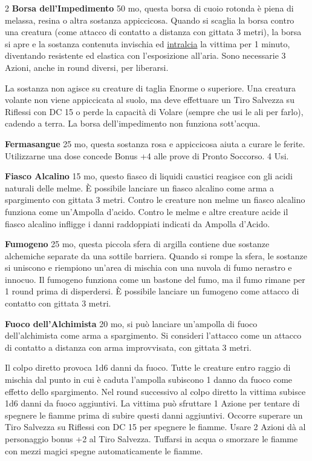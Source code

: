 \begin{multicols}{2}
\textbf{Borsa dell'Impedimento} 50 mo, questa borsa di cuoio rotonda è piena di melassa, resina o altra sostanza appiccicosa. Quando si scaglia la borsa contro una creatura (come attacco di contatto a distanza con gittata 3 metri), la borsa si apre e la sostanza contenuta invischia ed \hyperlink{intralciato}{intralcia} la vittima per 1 minuto, diventando resistente ed elastica con l'esposizione all'aria. Sono necessarie 3 Azioni, anche in round diversi, per liberarsi.

La sostanza non agisce su creature di taglia Enorme o superiore. Una creatura volante non viene appiccicata al suolo, ma deve effettuare un Tiro Salvezza su Riflessi con DC 15 o perde la capacità di Volare (sempre che usi le ali per farlo), cadendo a terra. La borsa dell'impedimento non funziona sott'acqua.

\textbf{Fermasangue}\hypertarget{Fermasangue}{}\label{fermasangue}\hypertarget{fermasangue}{} 25 mo, questa sostanza rosa e appiccicosa aiuta a curare le ferite. Utilizzarne una dose concede Bonus +4 alle prove di Pronto Soccorso. 4 Usi.

\textbf{Fiasco Alcalino} 15 mo, questo fiasco di liquidi caustici reagisce con gli acidi naturali delle melme. È possibile lanciare un fiasco alcalino come arma a spargimento con gittata 3 metri. Contro le creature non melme un fiasco alcalino funziona come un'Ampolla d'acido. Contro le melme e altre creature acide il fiasco alcalino infligge i danni raddoppiati indicati da Ampolla d'Acido.

\textbf{Fumogeno} 25 mo, questa piccola sfera di argilla contiene due sostanze alchemiche separate da una sottile barriera. Quando si rompe la sfera, le sostanze si uniscono e riempiono un'area di mischia con una nuvola di fumo nerastro e innocuo. Il fumogeno funziona come un bastone del fumo, ma il fumo rimane per 1 round prima di disperdersi. È possibile lanciare un fumogeno come attacco di contatto con gittata 3 metri.

\textbf{Fuoco dell'Alchimista}\hypertarget{Fuoco dell'Alchimista}{} 20 mo, si può lanciare un'ampolla di fuoco dell'alchimista come arma a spargimento. Si consideri l'attacco come un attacco di contatto a distanza con arma improvvisata, con gittata 3 metri.

Il colpo diretto provoca 1d6 danni da fuoco. Tutte le creature entro raggio di mischia dal punto in cui è caduta l'ampolla subiscono 1 danno da fuoco come effetto dello spargimento. Nel round successivo al colpo diretto la vittima subisce 1d6 danni da fuoco aggiuntivi. La vittima può sfruttare 1 Azione per tentare di spegnere le fiamme prima di subire questi danni aggiuntivi. Occorre superare un Tiro Salvezza su Riflessi con DC 15 per spegnere le fiamme. Usare 2 Azioni dà al personaggio bonus +2 al Tiro Salvezza. Tuffarsi in acqua o smorzare le fiamme con mezzi magici spegne automaticamente le fiamme.


\end{multicols}
